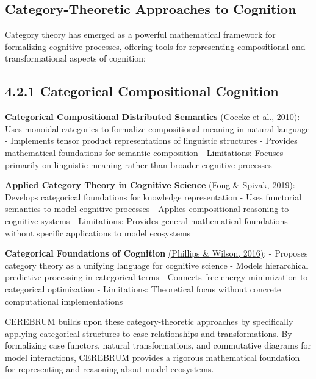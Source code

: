 \documentclass[
  11pt,
  letterpaper,
]{article}
\begin{document}
\hypertarget{category-theoretic-approaches-to-cognition}{%
\subsection{Category-Theoretic Approaches to
Cognition}\label{category-theoretic-approaches-to-cognition}}

Category theory has emerged as a powerful mathematical framework for
formalizing cognitive processes, offering tools for representing
compositional and transformational aspects of cognition:

\hypertarget{categorical-compositional-cognition}{%
\subsection{4.2.1 Categorical Compositional
Cognition}\label{categorical-compositional-cognition}}

\textbf{Categorical Compositional Distributed Semantics}
\protect\hyperlink{references}{(Coecke et al., 2010)}: - Uses monoidal
categories to formalize compositional meaning in natural language -
Implements tensor product representations of linguistic structures -
Provides mathematical foundations for semantic composition -
Limitations: Focuses primarily on linguistic meaning rather than broader
cognitive processes

\textbf{Applied Category Theory in Cognitive Science}
\protect\hyperlink{references}{(Fong \& Spivak, 2019)}: - Develops
categorical foundations for knowledge representation - Uses functorial
semantics to model cognitive processes - Applies compositional reasoning
to cognitive systems - Limitations: Provides general mathematical
foundations without specific applications to model ecosystems

\textbf{Categorical Foundations of Cognition}
\protect\hyperlink{references}{(Phillips \& Wilson, 2016)}: - Proposes
category theory as a unifying language for cognitive science - Models
hierarchical predictive processing in categorical terms - Connects free
energy minimization to categorical optimization - Limitations:
Theoretical focus without concrete computational implementations

CEREBRUM builds upon these category-theoretic approaches by specifically
applying categorical structures to case relationships and
transformations. By formalizing case functors, natural transformations,
and commutative diagrams for model interactions, CEREBRUM provides a
rigorous mathematical foundation for representing and reasoning about
model ecosystems.
\end{document}
